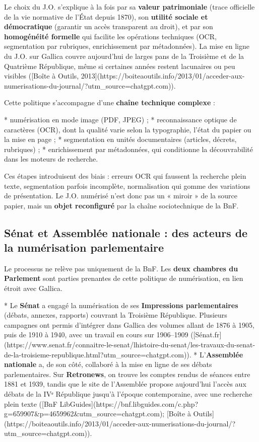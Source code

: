 Le choix du J.O. s’explique à la fois par sa \textbf{valeur patrimoniale} (trace officielle de la vie normative de l’État depuis 1870), son \textbf{utilité sociale et démocratique} (garantir un accès transparent au droit), et par son \textbf{homogénéité formelle} qui facilite les opérations techniques (OCR, segmentation par rubriques, enrichissement par métadonnées). La mise en ligne du J.O. sur Gallica couvre aujourd’hui de larges pans de la Troisième et de la Quatrième République, même si certaines années restent lacunaires ou peu visibles ([Boîte à Outils, 2013](https://boiteaoutils.info/2013/01/acceder-aux-numerisations-du-journal/?utm_source=chatgpt.com)).

Cette politique s’accompagne d’une \textbf{chaîne technique complexe} :

* numérisation en mode image (PDF, JPEG) ;
* reconnaissance optique de caractères (OCR), dont la qualité varie selon la typographie, l’état du papier ou la mise en page ;
* segmentation en unités documentaires (articles, décrets, rubriques) ;
* enrichissement par métadonnées, qui conditionne la découvrabilité dans les moteurs de recherche.

Ces étapes introduisent des biais : erreurs OCR qui faussent la recherche plein texte, segmentation parfois incomplète, normalisation qui gomme des variations de présentation. Le J.O. numérisé n’est donc pas un « miroir » de la source papier, mais un \textbf{objet reconfiguré} par la chaîne sociotechnique de la BnF.

\subsection{Sénat et Assemblée nationale : des acteurs de la numérisation parlementaire}

Le processus ne relève pas uniquement de la BnF. Les \textbf{deux chambres du Parlement} sont parties prenantes de cette politique de numérisation, en lien étroit avec Gallica.

* Le \textbf{Sénat} a engagé la numérisation de ses \textbf{Impressions parlementaires} (débats, annexes, rapports) couvrant la Troisième République. Plusieurs campagnes ont permis d’intégrer dans Gallica des volumes allant de 1876 à 1905, puis de 1910 à 1940, avec un travail en cours sur 1906–1909 ([Sénat.fr](https://www.senat.fr/connaitre-le-senat/lhistoire-du-senat/les-travaux-du-senat-de-la-troisieme-republique.html?utm_source=chatgpt.com)).
* L’\textbf{Assemblée nationale} a, de son côté, collaboré à la mise en ligne de ses débats parlementaires. Sur \textbf{Retronews}, on trouve les comptes rendus de séances entre 1881 et 1939, tandis que le site de l’Assemblée propose aujourd’hui l’accès aux débats de la IVᵉ République jusqu’à l’époque contemporaine, avec une recherche plein texte ([BnF LibGuides](https://bnf.libguides.com/c.php?g=659907&p=4659962&utm_source=chatgpt.com); [Boîte à Outils](https://boiteaoutils.info/2013/01/acceder-aux-numerisations-du-journal/?utm_source=chatgpt.com)).

